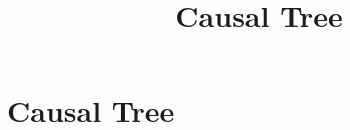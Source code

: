 \documentclass[hyperref={pdfpagelabels=false}]{beamer}
\begin{document}








\title[]
{Causal Tree}

\subtitle{}
\author{}
\institute{}
\date{}

\begin{frame}{}
  \titlepage
\end{frame}

\section{Causal Tree}
\end{document}
